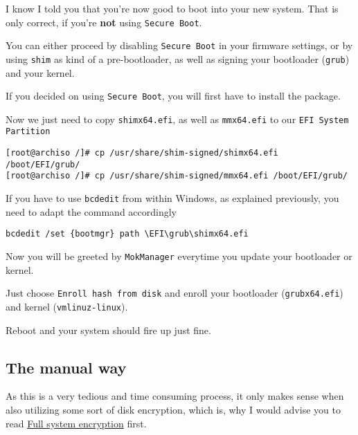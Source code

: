 \documentclass[9pt]{report}
\newenvironment{NOTE}
{\begin{tcolorbox}[colback=admonitionBG,coltitle=draculaFG,colframe=draculaBlue,colbacktitle=draculaBlue,title=NOTE]}
{\end{tcolorbox}}
\newenvironment{WARNING}
{\begin{tcolorbox}[colback=admonitionBG,coltitle=draculaBG,colframe=draculaOrange,colbacktitle=draculaOrange,title=WARNING]}
{\end{tcolorbox}}
\begin{document}
I know I told you that you’re now good to boot into your new system.
That is only correct, if you’re \textbf{not} using \texttt{Secure Boot}.


You can either proceed by disabling \texttt{Secure Boot} in your firmware settings, or by using \texttt{shim} as kind of a pre-bootloader, as well as signing your bootloader (\texttt{grub}) and your kernel.


If you decided on using \texttt{Secure Boot}, you will first have to install the package.


Now we just need to copy \texttt{shimx64.efi}, as well as \texttt{mmx64.efi} to our \texttt{EFI System Partition}


\begin{verbatim}
[root@archiso /]# cp /usr/share/shim-signed/shimx64.efi /boot/EFI/grub/
[root@archiso /]# cp /usr/share/shim-signed/mmx64.efi /boot/EFI/grub/
\end{verbatim}

\begin{NOTE}
    If you have to use \texttt{bcdedit} from within Windows, as explained previously, you need to adapt the command accordingly


    \begin{verbatim}
bcdedit /set {bootmgr} path \EFI\grub\shimx64.efi
    \end{verbatim}
\end{NOTE}

Now you will be greeted by \texttt{MokManager} everytime you update your bootloader or kernel.


Just choose \texttt{Enroll hash from disk} and enroll your bootloader (\texttt{grubx64.efi}) and kernel (\texttt{vmlinuz-linux}).


Reboot and your system should fire up just fine.



\newpage

\hypertarget{x-the-manual-way}{\subsection{The manual way}}
\begin{WARNING}
    As this is a very tedious and time consuming process, it only makes sense when also utilizing some sort of disk encryption, which is, why I would advise you to read \hyperlink{full-system-encryption}{Full system encryption} first.

\end{WARNING}
\end{document}
